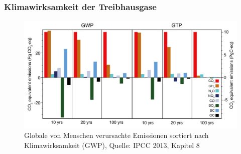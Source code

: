 \begin{frame}
	\frametitle{Klimawirksamkeit der Treibhausgase}

		\begin{figure}
			\centering
			  \includegraphics[width=.9\linewidth]{bilder/IPCC_GWP_anthropogenic_emissions.jpg}
			  \caption{Globale von Menschen verursachte Emissionen sortiert nach Klimawirksamkeit (GWP), Quelle: IPCC 2013, Kapitel 8}
		\end{figure}


\end{frame}
